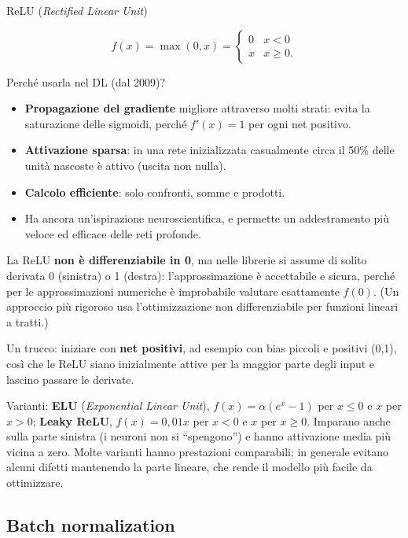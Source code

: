 \begin{boxdefinition}{ReLU (\emph{Rectified Linear Unit})}

\[
f(x) = \max(0, x) = \begin{cases} 0 & x < 0 \\ x & x \ge 0. \end{cases}
\]

\end{boxdefinition}

Perché usarla nel DL (dal 2009)?

\begin{itemize}
\tightlist
\item
  \textbf{Propagazione del gradiente} migliore attraverso molti strati:
  evita la saturazione delle sigmoidi, perché \(f'(x) = 1\) per ogni net
  positivo.
\item
  \textbf{Attivazione sparsa}: in una rete inizializzata casualmente
  circa il 50\% delle unità nascoste è attivo (uscita non nulla).
\item
  \textbf{Calcolo efficiente}: solo confronti, somme e prodotti.
\item
  Ha ancora un'ispirazione neuroscientifica, e permette un addestramento
  più veloce ed efficace delle reti profonde.
\end{itemize}

La ReLU \textbf{non è differenziabile in 0}, ma nelle librerie si assume
di solito derivata 0 (sinistra) o 1 (destra): l'approssimazione è
accettabile e sicura, perché per le approssimazioni numeriche è
improbabile valutare esattamente \(f(0)\). (Un approccio più rigoroso
usa l'ottimizzazione non differenziabile per funzioni lineari a tratti.)

Un trucco: iniziare con \textbf{net positivi}, ad esempio con bias
piccoli e positivi (0,1), così che le ReLU siano inizialmente attive per
la maggior parte degli input e lascino passare le derivate.

Varianti: \textbf{ELU} (\emph{Exponential Linear Unit}),
\(f(x) = \alpha(e^x - 1)\) per \(x \le 0\) e \(x\) per \(x > 0\);
\textbf{Leaky ReLU}, \(f(x) = 0{,}01x\) per \(x < 0\) e \(x\) per
\(x \ge 0\). Imparano anche sulla parte sinistra (i neuroni non si
``spengono'') e hanno attivazione media più vicina a zero. Molte
varianti hanno prestazioni comparabili; in generale evitano alcuni
difetti mantenendo la parte lineare, che rende il modello più facile da
ottimizzare.

\subsection{Batch normalization}\label{batch-normalization}

